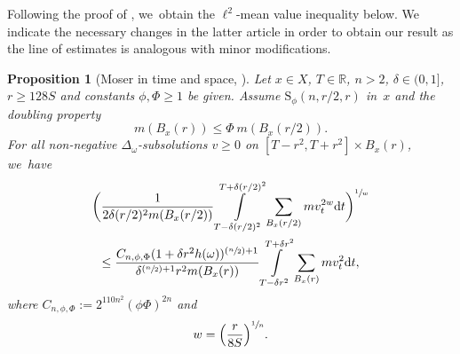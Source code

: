 \documentclass[JEP,XML,SOM,Unicode,published]{cedram}
\newcommand{\Psfrac}[2]{(\sfrac{#1}{#2})}
\newcommand{\rS}{\mathrm{S}}
\theoremstyle{plain}
\newtheorem{proposition}[theorem]{Proposition}
\theoremstyle{definition}
\newcommand{\RR}{\mathbb{R}}
\newcommand{\drm}{\mathrm{d}}
\let\oldint\int
\renewcommand{\int}{\oldint\limits}
\begin{document}
Following the proof of {\cite[Th.\,2.7]{KellerRose-22a}}, we~obtain the $\ell^2$-mean value inequality {below}. We indicate the necessary changes in the latter article in order to obtain our result as the line of estimates is analogous with minor modifications.
\begin{proposition}[Moser in time and space, ]\label{thm:KR22-subsolution}
Let $ x\in X $, $T\in\RR$,
$n>2$, $\delta\in(0,1]$, $r\geq 128 S$ and constants $\phi,\Phi\geq 1$ be given.
Assume $\rS_{\phi}(n,r/2,r)$ in~$ x$ and the doubling property
\[
m(B_x(r))\leq \Phi\ m(B_x(r/2)).
\]
For all non-negative $\Delta_\omega$-subsolutions $v\geq 0$ on $[T-r^2,T+r^2]\times B_{x}(r)$, we~have
\begin{multline*}
\biggl(\frac{1}{2 \delta (r/2)^2m({B_{x}(r/2)})}\int\limits_{T-\delta (r/2)^2}^{T+\delta (r/2)^2}\sum_{B_{x}(r/2)} mv_t^{2w}\drm t\biggr)^{\sfrac{1}{w}}
\\
\leq
\frac{C_{n,\phi,\Phi}(1+\delta r^2h(\omega))^{\Psfrac{n}{2}+1} }{\delta^{\Psfrac{n}{2}+1} r^{2}m({B_{x}(r)})}
\int\limits_{T- \delta r^2}^{T+\delta r^2}\sum_{B_{x}(r)} mv_t^{2}\drm t,
\end{multline*}
where $C_{n,\phi,\Phi}:=2^{{110}n^2}(\phi\Phi)^{2n}$
and
\[
w=\Bigl(\frac{r}{8S}\Bigr)^{\sfrac{1}{n}}.
\]
\end{proposition}
\end{document}
